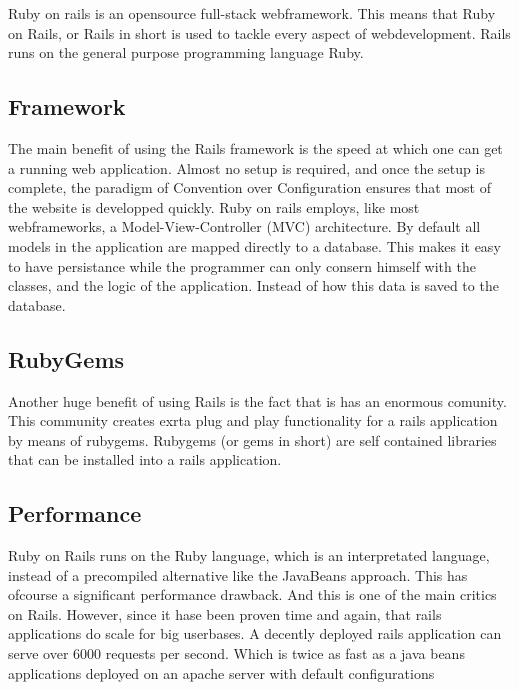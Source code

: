 Ruby on rails is an opensource full-stack webframework. This means that Ruby on Rails, or Rails in short is used to tackle every aspect of webdevelopment. Rails runs on the general purpose programming language Ruby.
\subsection{Framework} %
\label{sub:Framework}
The main benefit of using the Rails framework is the speed at which one can get a running web application. Almost no setup is required, and once the setup is complete, the paradigm of Convention over Configuration ensures that most of the website is developped quickly.
Ruby on rails employs, like most webframeworks, a Model-View-Controller (MVC) architecture. By default all models in the application are mapped directly to a database. This makes it easy to have persistance while the programmer can only consern himself with the classes, and the logic of the application. Instead of how this data is saved to the database.
\subsection{RubyGems} %
\label{sub:RubyGems}
Another huge benefit of using Rails is the fact that is has an enormous comunity. This community creates exrta plug and play functionality for a rails application by means of rubygems. Rubygems (or gems in short) are self contained libraries that can be installed into a rails application.
\subsection{Performance} %
\label{sub:subsection name}
Ruby on Rails runs on the Ruby language, which is an interpretated language, instead of a precompiled alternative like the JavaBeans approach. This has ofcourse a significant performance drawback. And this is one of the main critics on Rails. However, since it hase been proven time and again, that rails applications do scale for big userbases. A decently deployed rails application can serve over 6000 requests per second. Which is twice as fast as a java beans applications deployed on an apache server with default configurations
